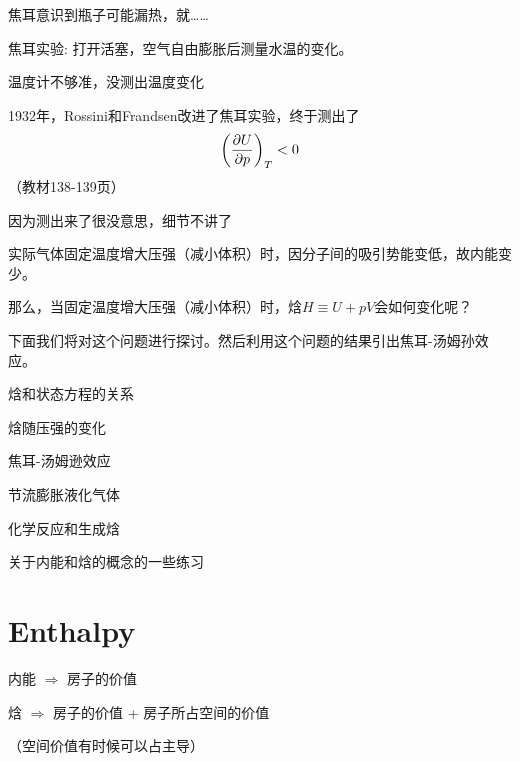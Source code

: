 \documentclass[CJK]{beamer}
\begin{document}
\begin{frame}
\bch
焦耳意识到瓶子可能漏热，就……

焦耳实验: 打开活塞，空气自由膨胀后测量水温的变化。
\emini
{}
\emini

\ech
\end{frame}


\begin{frame}
\bch


温度计不够准，没测出温度变化 
\ech
\end{frame}


\begin{frame}
\bch
1932年，Rossini和Frandsen改进了焦耳实验，终于测出了
$$\left(\frac{\partial U}{\partial p}\right)_{T} < 0 $$
（教材138-139页）

因为测出来了很没意思，细节不讲了\bye
\ech
\end{frame}


\begin{frame}
\bch
实际气体固定温度增大压强（减小体积）时，因分子间的吸引势能变低，故内能变少。


那么，当固定温度增大压强（减小体积）时，焓$H\equiv U + pV$会如何变化呢？

\skiplines

下面我们将对这个问题进行探讨。然后利用这个问题的结果引出焦耳-汤姆孙效应。
\ech
\end{frame}


\begin{frame}
\bch
\bitem
\item{焓和状态方程的关系}
\item{焓随压强的变化}
\item{焦耳-汤姆逊效应}
\item{节流膨胀液化气体}
\item{化学反应和生成焓}
\item{关于内能和焓的概念的一些练习}
\eitem
\ech
\end{frame}

\section{Enthalpy}

\begin{frame}
\bch

内能 $\Rightarrow$ 房子的价值

\skipline

焓 $\Rightarrow$ 房子的价值 + 房子所占空间的价值



（空间价值有时候可以占主导）


\ech
\end{frame}
\end{document}
